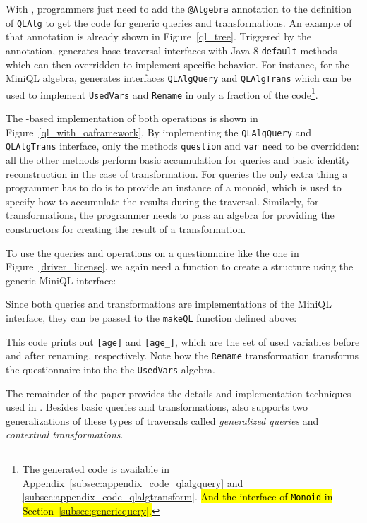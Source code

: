 With \Name, programmers just need to add the \lstinline{@Algebra} annotation
to the definition of \lstinline{QLAlg} to get the code for generic
queries and transformations. An example of that annotation is already
shown in Figure~\ref{ql_tree}.
Triggered by the annotation, \name generates base traversal interfaces with Java 8 \lstinline{default} methods which can then overridden to implement specific behavior.
For instance, for the MiniQL algebra, \name generates interfaces
\lstinline{QLAlgQuery} and
\lstinline{QLAlgTrans} which can be used to implement \lstinline{UsedVars} and \lstinline{Rename} in only a fraction of the code\footnote{The generated code is available in Appendix~\ref{subsec:appendix_code_qlalgquery} and \ref{subsec:appendix_code_qlalgtransform}. \hl{And the interface of \lstinline{Monoid} in Section~\ref{subsec:genericquery}.}}.

The \name-based implementation of both operations is shown in Figure~\ref{ql_with_oaframework}.
By implementing the
\lstinline{QLAlgQuery} and \lstinline{QLAlgTrans} interface, only the methods
\lstinline{question} and \lstinline{var} need to be overridden: all the other methods perform basic accumulation for queries and basic identity reconstruction in the case of transformation.
For queries the
only extra thing a programmer has to do is to provide an instance of a
monoid, which is used to specify how to accumulate the results during
the traversal. Similarly, for transformations, the programmer needs to
pass an algebra for providing the constructors for creating the result of a transformation.

To use the queries and operations on a questionnaire like the one in Figure~\ref{driver_license}. we again need a function to create a structure using the generic MiniQL interface:


Since both queries and transformations are implementations of the MiniQL interface, they can be passed to the \lstinline{makeQL} function defined above:

This code prints out  \lstinline{[age]} and \lstinline{[age_]}, which
are the set of used variables before and after renaming, respectively.
Note how the \lstinline{Rename} transformation transforms the questionnaire into the the \lstinline{UsedVars} algebra.

The remainder of the paper provides the details and implementation
techniques used in \Name. Besides basic queries and transformations,
\name also supports two generalizations of these types of traversals
called \emph{generalized queries} and \emph{contextual transformations}.

